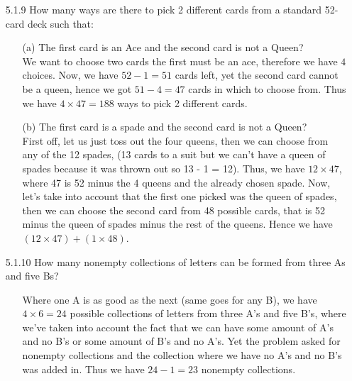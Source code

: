 \documentclass[12pt]{article}
\begin{document}
\begin{enumerate}
\item[5.1.9] How many ways are there to pick 2 different cards from a standard 52-card deck such that:
\begin{enumerate}
\item[(a)] The first card is an Ace and the second card is not a Queen? \\
We want to choose two cards the first must be an ace, therefore we have $4$ choices.
Now, we have $52 - 1 = 51$ cards left, yet the second card cannot be a queen, hence we got $51 - 4 = 47$ cards in which to choose from. Thus we have $4 \times 47 = 188$ ways to pick 2 different cards.
\item[(b)] The first card is a spade and the second card is not a Queen? \\
First off, let us just toss out the four queens, then we can choose from any of the 12 spades, 
(13 cards to a suit but we can't have a queen of spades because it was thrown out so 13 - 1 = 12). 
Thus, we have $12 \times 47$, where 47 is 52 minus the 4 queens and the already chosen spade. Now, 
let's take into account that the first one picked was the queen of spades, then we can choose the second card
from 48 possible cards, that is 52 minus the queen of spades minus the rest of the queens. Hence we have
$(12 \times 47) + (1 \times 48)$.
\end{enumerate}

\item[5.1.10] How many nonempty collections of letters can be formed from three As and five Bs?
\begin{enumerate}
\item[] Where one A is as good as the next (same goes for any B), we have $4 \times 6 = 24$ possible collections of letters from three A's and five B's, where we've taken into account the fact that we can have some amount of A's and no B's or some amount of B's and no A's. Yet the problem asked for nonempty collections and the collection where we have no A's and no B's was added in. Thus we have $24 - 1 = 23$ nonempty collections.
\end{enumerate}


\end{enumerate}
\end{document}
